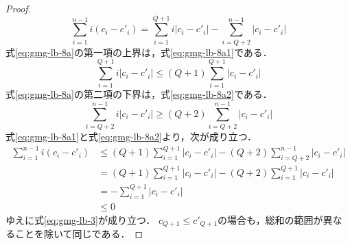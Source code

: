 \begin{proof}
\begin{equation}
    \label{eq:gmg-lb-8a}
    \sum_{i=1}^{n-1}i(c_i-c'_i)=
    \sum_{i=1}^{Q+1}i|c_i-c'_i|-\sum_{i=Q+2}^{n-1}|c_i-c'_i|
  \end{equation}
  式\ref{eq:gmg-lb-8a}の第一項の上界は，式\ref{eq:gmg-lb-8a1}である．
  \begin{equation}
    \label{eq:gmg-lb-8a1}
    \sum_{i=1}^{Q+1}i|c_i-c'_i|\leq (Q+1)\sum_{i=1}^{Q+1}|c_i-c'_i|
  \end{equation}
  式\ref{eq:gmg-lb-8a}の第二項の下界は，式\ref{eq:gmg-lb-8a2}である．
  \begin{equation}
    \label{eq:gmg-lb-8a2}
    \sum_{i=Q+2}^{n-1}i|c_i-c'_i|\geq (Q+2)\sum_{i=Q+2}^{n-1}|c_i-c'_i|
  \end{equation}
  式\ref{eq:gmg-lb-8a1}と式\ref{eq:gmg-lb-8a2}より，次が成り立つ．
  \begin{align*}
    \sum_{i=1}^{n-1}i(c_i-c'_i)
    &\leq (Q+1)\sum_{i=1}^{Q+1}|c_i-c'_i|-(Q+2)\sum_{i=Q+2}^{n-1}|c_i-c'_i| \\
    &= (Q+1)\sum_{i=1}^{Q+1}|c_i-c'_i|-(Q+2)\sum_{i=1}^{Q+1}|c_i-c'_i| \\
    &= -\sum_{i=1}^{Q+1}|c_i-c'_i| \\
    &\leq 0
  \end{align*}
  ゆえに式\ref{eq:gmg-lb-3}が成り立つ．
  $c_{Q+1}\leq c'_{Q+1}$の場合も，総和の範囲が異なることを除いて同じである．
\end{proof}

